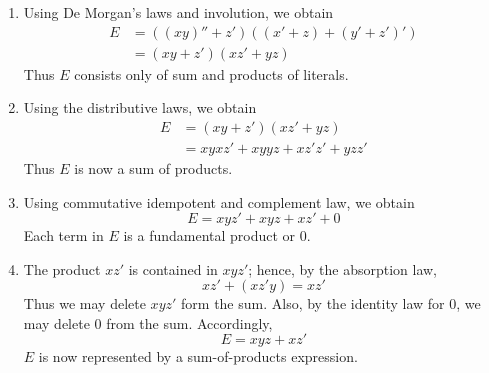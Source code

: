 \documentclass[../main-sheet.tex]{subfiles}
\begin{document}
\begin{enumerate}[label=Step \arabic*.]
    \item Using De Morgan's laws and involution, we obtain
    \begin{align*}
        E&=((xy)''+ z') ((x'+ z) + (y'+z')')\\
        &=(xy+z') (x z' + y z)
    \end{align*}
    Thus $ E $ consists only of sum and products of literals.
    \item Using the distributive laws, we obtain
    \begin{align*}
        E&=(xy+z') (x z' + y z)\\
        &=xyxz'+xyyz+xz'z'+yzz'
    \end{align*}
    Thus $ E $ is now a sum of products.
    \item Using commutative idempotent and complement law, we obtain
    \[E=xyz'+xyz+xz'+0\]
    Each term in $ E $ is a fundamental product or 0.
    \item The product $ xz' $ is contained in $ xyz' $; hence, by the absorption law,
    \[
        xz'+(xz'y)=xz'
    \]
    Thus we may delete $ xyz' $ form the sum. Also, by the identity law for 0, we may delete 0 from the sum. Accordingly,
    \[
        E=xyz+xz'
    \]
    $ E $ is now represented by a sum-of-products expression.
\end{enumerate}
\end{document}
